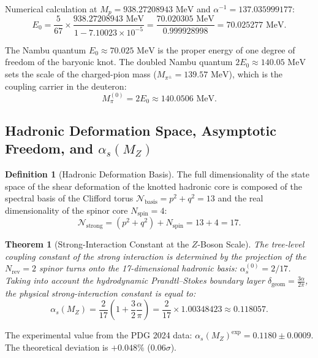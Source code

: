 \documentclass[11pt,a4paper]{article}
\newtheorem{theorem}{Theorem}
\theoremstyle{definition}
\newtheorem{definition}{Definition}
\theoremstyle{remark}
\begin{document}
Numerical calculation at $M_p = 938.27208943\text{ MeV}$ and $\alpha^{-1} = 137.035999177$:
\begin{equation}
	E_0 = \frac{5}{67} \times \frac{938.27208943\text{ MeV}}{1 - 7.10023 \times 10^{-5}} = \frac{70.020305\text{ MeV}}{0.999928998} = 70.025277\text{ MeV}.
	\label{eq:nambu_quantum_val}
\end{equation}

The Nambu quantum $E_0 \approx 70.025\text{ MeV}$ is the proper energy of one degree of freedom of the baryonic knot. The doubled Nambu quantum $2E_0 \approx 140.05\text{ MeV}$ sets the scale of the charged-pion mass ($M_{\pi^\pm} = 139.57\text{ MeV}$), which is the coupling carrier in the deuteron:
\begin{equation}
	M_\pi^{(0)} = 2 E_0 \approx 140.0506\text{ MeV}.
	\label{eq:pion_mass_bare_nambu}
\end{equation}

\subsection{Hadronic Deformation Space, Asymptotic Freedom, and $\alpha_s(M_Z)$}

\begin{definition}[Hadronic Deformation Basis]
	The full dimensionality of the state space of the shear deformation of the knotted hadronic core is composed of the spectral basis of the Clifford torus $\mathcal{N}_{\mathrm{basis}} = p^2 + q^2 = 13$ and the real dimensionality of the spinor core $N_{\mathrm{spin}} = 4$:
\begin{equation}
	\mathcal{N}_{\mathrm{strong}} = (p^2 + q^2) + N_{\mathrm{spin}} = 13 + 4 = 17.
\label{eq:strong_basis_dimension_exact}
\end{equation}
\end{definition}

\begin{theorem}[Strong-Interaction Constant at the $Z$-Boson Scale]
	\label{thm:alpha_s_mz_exact}
	The tree-level coupling constant of the strong interaction is determined by the projection of the $N_{\mathrm{rev}} = 2$ spinor turns onto the 17-dimensional hadronic basis: $\alpha_s^{(0)} = 2/17$. Taking into account the hydrodynamic Prandtl--Stokes boundary layer $\delta_{\mathrm{geom}} = \frac{3\alpha}{2\pi}$, the physical strong-interaction constant is equal to:
\begin{equation}
	\alpha_s(M_Z) = \frac{2}{17} \left( 1 + \frac{3}{2}\frac{\alpha}{\pi} \right) = \frac{2}{17} \times 1.00348423 \approx 0.118057.
\label{eq:alpha_s_mz_derivation}
\end{equation}
\end{theorem}
The experimental value from the PDG 2024 data: $\alpha_s(M_Z)^{\mathrm{exp}} = 0.1180 \pm 0.0009$. The theoretical deviation is $+0.048\%$ ($0.06\sigma$).
\end{document}
